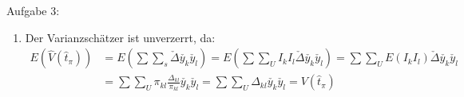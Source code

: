 \begin{Solution}{{Aufgabe 3:}}
\begin{enumerate}
\begin{align*}
&= N^2\frac{1}{n}\frac{N-n}{N-1}\left(\frac{1}{N}\sum_U y_k^2 - \frac{1}{N^2}\sum\sum_{U}y_k y_l\right)\\
&=N^2\frac{1-f}{n} S_{y_U}^2
\end{align*}
\item Der Varianzschätzer ist unverzerrt, da:
\begin{align*}
E\left(\hat{V}(\hat{t}_\pi)\right) &= E\left(\sum\sum_s \check{\Delta}\check{y_k}\check{y_l}\right) = E\left(\sum\sum_U I_k I_l\check{\Delta}\check{y_k}\check{y_l}\right) = \sum\sum_U E(I_k I_l)\check{\Delta}\check{y_k}\check{y_l} \\
&= \sum\sum_U \pi_{kl} \frac{\Delta_{kl}}{\pi_{kl}} \check{y_k}\check{y_l} = \sum\sum_U \Delta_{kl}\check{y_k}\check{y_l} = V(\hat{t}_\pi)
\end{align*}
\end{enumerate}
\end{Solution}
